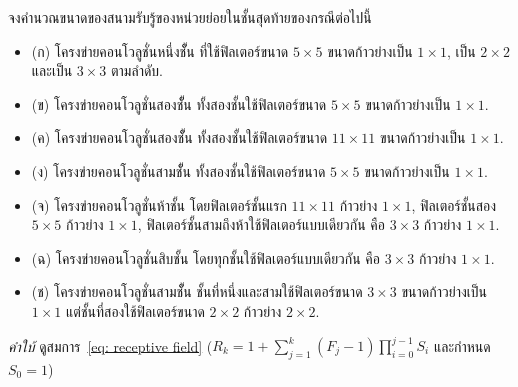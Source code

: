 \begin{Exercise}
\label{ex: receptive field}

จงคำนวณขนาดของสนามรับรู้ของหน่วยย่อยในชั้นสุดท้ายของกรณีต่อไปนี้
\begin{itemize}
	\item (ก) โครงข่ายคอนโวลูชั่นหนึ่งชัั้น ที่ใช้ฟิลเตอร์ขนาด $5 \times 5$ ขนาดก้าวย่างเป็น $1 \times 1$, เป็น $2 \times 2$ และเป็น $3 \times 3$ ตามลำดับ.
%	
	\item (ข) โครงข่ายคอนโวลูชั่นสองชัั้น ทั้งสองชั้นใช้ฟิลเตอร์ขนาด $5 \times 5$ ขนาดก้าวย่างเป็น $1 \times 1$.
	\item (ค) โครงข่ายคอนโวลูชั่นสองชัั้น ทั้งสองชั้นใช้ฟิลเตอร์ขนาด $11 \times 11$ ขนาดก้าวย่างเป็น $1 \times 1$.
	\item (ง) โครงข่ายคอนโวลูชั่นสามชัั้น ทั้งสองชั้นใช้ฟิลเตอร์ขนาด $5 \times 5$ ขนาดก้าวย่างเป็น $1 \times 1$.
	\item (จ) โครงข่ายคอนโวลูชั่นห้าชั้น โดยฟิลเตอร์ชั้นแรก $11 \times 11$ ก้าวย่าง $1 \times 1$,
ฟิลเตอร์ชั้นสอง $5 \times 5$ ก้าวย่าง $1 \times 1$,
ฟิลเตอร์ชั้นสามถึงห้าใช้ฟิลเตอร์แบบเดียวกัน คือ $3 \times 3$ ก้าวย่าง $1 \times 1$.
	\item (ฉ) โครงข่ายคอนโวลูชั่นสิบชั้น โดยทุกชั้นใช้ฟิลเตอร์แบบเดียวกัน คือ $3 \times 3$ ก้าวย่าง $1 \times 1$.
	\item (ช) โครงข่ายคอนโวลูชั่นสามชัั้น ชั้นที่หนึ่งและสามใช้ฟิลเตอร์ขนาด $3 \times 3$ ขนาดก้าวย่างเป็น $1 \times 1$
	แต่ชั้นที่สองใช้ฟิลเตอร์ขนาด $2 \times 2$ ก้าวย่าง $2 \times 2$.
\end{itemize}	
%	
\textit{คำใบ้} ดูสมการ~\ref{eq: receptive field} ($R_k = 1 + \sum_{j=1}^k (F_j - 1) \prod_{i=0}^{j-1} S_i$ และกำหนด $S_0 = 1$)

\end{Exercise}

